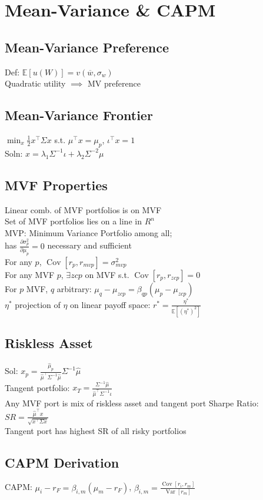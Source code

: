 \section{Mean-Variance \& CAPM}
	\subsection*{Mean-Variance Preference}
	Def: $\mathbb{E}\left[u\left(W\right)\right] = v\left(\overline{w}, \sigma_{w}\right)$\\
	Quadratic utility $\implies$ MV preference
	
	\subsection*{Mean-Variance Frontier}
	$\min_{x}\frac{1}{2}x^{\intercal}\Sigma x$ s.t. $\mu^{\intercal}x = \mu_{p}$, $\iota^{\intercal}x = 1$\\
	Soln: $x = \lambda_{1}\Sigma^{-1}\iota + \lambda_{2}\Sigma^{-2}\mu$
	
	\subsection*{MVF Properties}
	Linear comb. of MVF portfolios is on MVF\\
	Set of MVF portfolios lies on a line in $R^{n}$\\
	MVP: Minimum Variance Portfolio among all;\\
	has $\frac{\partial\sigma_{p}^{2}}{\partial\mu_{p}} = 0$ necessary and sufficient\\
	For any $p$, $\operatorname{Cov}\left[r_{p}, r_{mvp}\right] = \sigma^{2}_{mvp}$\\
	For any MVF $p$, $\exists zcp$ on MVF s.t. $\operatorname{Cov}\left[r_{p}, r_{zcp}\right] = 0$\\
	For $p$ MVF, $q$ arbitrary: $\mu_{q} - \mu_{zcp} = \beta_{qp}\left(\mu_{p} - \mu_{zcp}\right)$\\
	$\eta^{\ast}$ projection of $\eta$ on linear payoff space: $r^{\ast} = \frac{\eta^{\ast}}{\mathbb{E}\left[\left(\eta^{\ast}\right)^{2}\right]}$
	
	\subsection*{Riskless Asset}
	Sol: $x_{p} = \frac{\hat{\mu}_{p}}{\hat{\mu}^{\intercal}\Sigma^{-1}\hat{\mu}}\Sigma^{-1}\hat{\mu}$\\
	Tangent portfolio: $x_{T} = \frac{\Sigma^{-1}\hat{\mu}}{\hat{\mu}^{\intercal}\Sigma^{-1}\iota}$\\
	Any MVF port is mix of riskless asset and tangent port
	Sharpe Ratio: $SR = \frac{\hat{\mu}^{\intercal}x}{\sqrt{x^{\intercal}\Sigma x}}$\\
	Tangent port has highest SR of all risky portfolios
	
	\subsection*{CAPM Derivation}
	CAPM: $\mu_{i} - r_{F} = \beta_{i,m}\left(\mu_{m} - r_{F}\right)$, $\beta_{i,m} = \frac{\operatorname{Cov}\left[r_{i}, r_{m}\right]}{\operatorname{Var}\left[r_{m}\right]}$
	